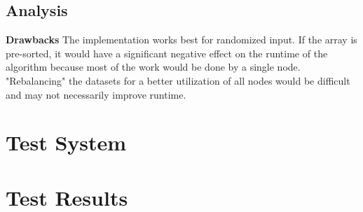 \documentclass[11pt,a4paper]{article}
\begin{document}
\subsection{Analysis}

\textbf{Drawbacks}\newline
The implementation works best for randomized input. If the array is pre-sorted, it would have a significant negative effect on the runtime of the algorithm because most of the work would be done by a single node. "Rebalancing" the datasets for a better utilization of all nodes would be difficult and may not necessarily improve runtime. 

\section{Test System}

\section{Test Results}
\end{document}
